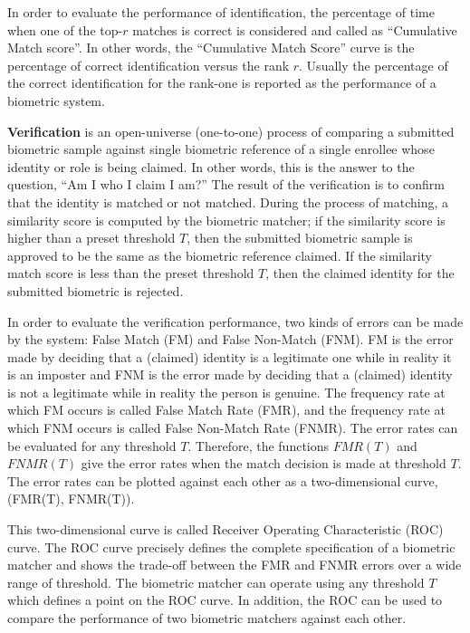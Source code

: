 In order to evaluate the performance of identification, the
percentage of time when one of the top-$r$ matches is correct is
considered and called as ``Cumulative Match score''. In other words,
the ``Cumulative Match Score'' curve is the percentage of correct
identification versus the rank $r$. Usually the percentage of the
correct identification for the rank-one is reported as the
performance of a biometric system.

\item \textbf{Verification} is an open-universe (one-to-one) process of comparing a
submitted biometric sample against single biometric reference of a
single enrollee whose identity or role is being claimed. In other
words, this is the answer to the question, ``Am I who I claim I
am?'' The result of the verification is to confirm that the identity
is matched or not matched. During the process of matching, a
similarity score is computed by the biometric matcher; if the
similarity score is higher than a preset threshold $T$, then the
submitted biometric sample is approved to be the same as the
biometric reference claimed. If the similarity match score is less
than the preset threshold $T$, then the claimed identity for the
submitted biometric is rejected.

In order to evaluate the verification performance, two kinds of
errors can be made by the system: False Match (FM) and False
Non-Match (FNM). FM is the error made by deciding that a (claimed)
identity is a legitimate one while in reality it is an imposter and
FNM is the error made by deciding that a (claimed) identity is not a
legitimate while in reality the person is genuine. The frequency
rate at which FM occurs is called False Match Rate (FMR), and the
frequency rate at which FNM occurs is called False Non-Match Rate
(FNMR). The error rates can be evaluated for any threshold $T$.
Therefore, the functions $FMR(T)$ and $FNMR(T)$ give the error rates
when the match decision is made at threshold $T$. The error rates
can be plotted against each other as a two-dimensional curve,
(FMR(T), FNMR(T)).

This two-dimensional curve is called Receiver Operating
Characteristic (ROC) curve. The ROC curve precisely defines the
complete specification of a biometric matcher and shows the
trade-off between the FMR and FNMR errors over a wide range of
threshold. The biometric matcher can operate using any threshold $T$
which defines a point on the ROC curve. In addition, the ROC can be
used to compare the performance of two biometric matchers against
each other. \ei
